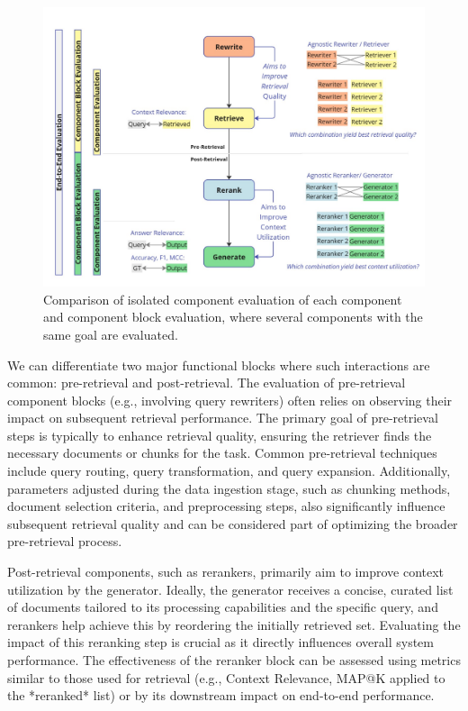 \begin{figure}[!ht]
  \centering
  \includegraphics[width=\textwidth]{images/ComponentBlockEvaluation.pdf}
  \caption{Comparison of isolated component evaluation of each component and component block evaluation, where several components with the same goal are evaluated.}
  \label{fig:componentblockeval}
\end{figure}


We can differentiate two major functional blocks where such interactions are common: pre-retrieval and post-retrieval. The evaluation of pre-retrieval component blocks (e.g., involving query rewriters) often relies on observing their impact on subsequent retrieval performance. The primary goal of pre-retrieval steps is typically to enhance retrieval quality, ensuring the retriever finds the necessary documents or chunks for the task. Common pre-retrieval techniques include query routing, query transformation, and query expansion. Additionally, parameters adjusted during the data ingestion stage, such as chunking methods, document selection criteria, and preprocessing steps, also significantly influence subsequent retrieval quality and can be considered part of optimizing the broader pre-retrieval process.

Post-retrieval components, such as rerankers, primarily aim to improve context utilization by the generator. Ideally, the generator receives a concise, curated list of documents tailored to its processing capabilities and the specific query, and rerankers help achieve this by reordering the initially retrieved set. Evaluating the impact of this reranking step is crucial as it directly influences overall system performance. The effectiveness of the reranker block can be assessed using metrics similar to those used for retrieval (e.g., Context Relevance, MAP@K applied to the *reranked* list) or by its downstream impact on end-to-end performance.

